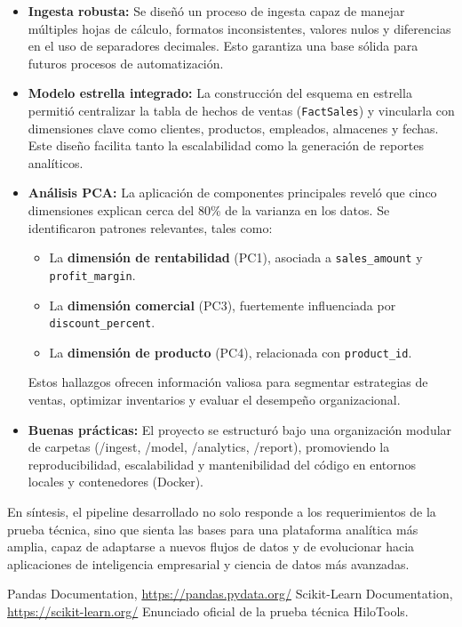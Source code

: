 \documentclass[12pt,a4paper]{article}
\begin{document}
\begin{itemize}
    \item \textbf{Ingesta robusta:} Se diseñó un proceso de ingesta capaz de manejar 
    múltiples hojas de cálculo, formatos inconsistentes, valores nulos y diferencias 
    en el uso de separadores decimales. Esto garantiza una base sólida para futuros 
    procesos de automatización.

    \item \textbf{Modelo estrella integrado:} La construcción del esquema en estrella 
    permitió centralizar la tabla de hechos de ventas (\texttt{FactSales}) y vincularla 
    con dimensiones clave como clientes, productos, empleados, almacenes y fechas. 
    Este diseño facilita tanto la escalabilidad como la generación de reportes analíticos.

    \item \textbf{Análisis PCA:} La aplicación de componentes principales reveló que 
    cinco dimensiones explican cerca del 80\% de la varianza en los datos. Se 
    identificaron patrones relevantes, tales como:
    \begin{itemize}
        \item La \textbf{dimensión de rentabilidad} (PC1), asociada a 
        \texttt{sales\_amount} y \texttt{profit\_margin}.
        \item La \textbf{dimensión comercial} (PC3), fuertemente influenciada por 
        \texttt{discount\_percent}.
        \item La \textbf{dimensión de producto} (PC4), relacionada con 
        \texttt{product\_id}.
    \end{itemize}
    Estos hallazgos ofrecen información valiosa para segmentar estrategias de ventas, 
    optimizar inventarios y evaluar el desempeño organizacional.

    \item \textbf{Buenas prácticas:} El proyecto se estructuró bajo una organización 
    modular de carpetas (/ingest, /model, /analytics, /report), promoviendo la 
    reproducibilidad, escalabilidad y mantenibilidad del código en entornos locales 
    y contenedores (Docker).
\end{itemize}

En síntesis, el pipeline desarrollado no solo responde a los requerimientos de la 
prueba técnica, sino que sienta las bases para una plataforma analítica más amplia, 
capaz de adaptarse a nuevos flujos de datos y de evolucionar hacia aplicaciones de 
inteligencia empresarial y ciencia de datos más avanzadas.


\begin{thebibliography}{9}
 Pandas Documentation, \url{https://pandas.pydata.org/}
 Scikit-Learn Documentation, \url{https://scikit-learn.org/}
 Enunciado oficial de la prueba técnica HiloTools.
\end{thebibliography}
\end{document}
